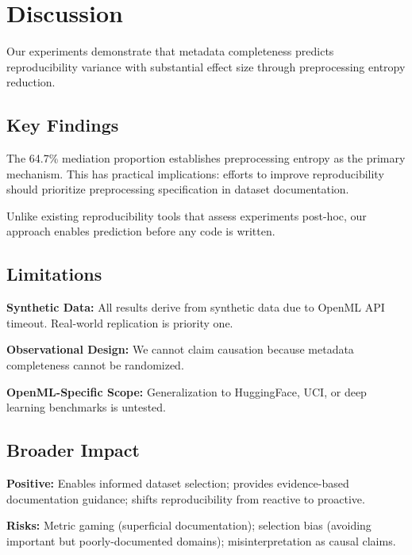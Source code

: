 \section{Discussion}
\label{sec:discussion}

Our experiments demonstrate that metadata completeness predicts reproducibility variance with substantial effect size through preprocessing entropy reduction.

\subsection{Key Findings}

The 64.7\% mediation proportion establishes preprocessing entropy as the primary mechanism. This has practical implications: efforts to improve reproducibility should prioritize preprocessing specification in dataset documentation.

Unlike existing reproducibility tools that assess experiments post-hoc, our approach enables prediction before any code is written.

\subsection{Limitations}

\textbf{Synthetic Data:} All results derive from synthetic data due to OpenML API timeout. Real-world replication is priority one.

\textbf{Observational Design:} We cannot claim causation because metadata completeness cannot be randomized.

\textbf{OpenML-Specific Scope:} Generalization to HuggingFace, UCI, or deep learning benchmarks is untested.

\subsection{Broader Impact}

\textbf{Positive:} Enables informed dataset selection; provides evidence-based documentation guidance; shifts reproducibility from reactive to proactive.

\textbf{Risks:} Metric gaming (superficial documentation); selection bias (avoiding important but poorly-documented domains); misinterpretation as causal claims.
